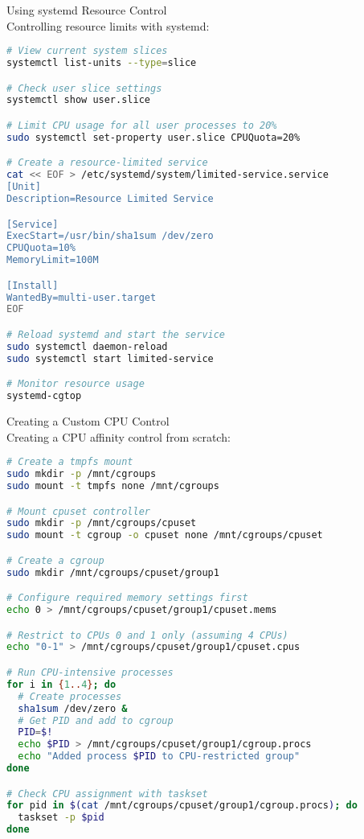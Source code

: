 \begin{example2}{Using systemd Resource Control}\\
    Controlling resource limits with systemd:
    
\begin{lstlisting}[language=bash, style=basesmol]
# View current system slices
systemctl list-units --type=slice

# Check user slice settings
systemctl show user.slice

# Limit CPU usage for all user processes to 20%
sudo systemctl set-property user.slice CPUQuota=20%

# Create a resource-limited service
cat << EOF > /etc/systemd/system/limited-service.service
[Unit]
Description=Resource Limited Service

[Service]
ExecStart=/usr/bin/sha1sum /dev/zero
CPUQuota=10%
MemoryLimit=100M

[Install]
WantedBy=multi-user.target
EOF

# Reload systemd and start the service
sudo systemctl daemon-reload
sudo systemctl start limited-service

# Monitor resource usage
systemd-cgtop
\end{lstlisting}
\end{example2}

\begin{example2}{Creating a Custom CPU Control}\\
    Creating a CPU affinity control from scratch:
    
\begin{lstlisting}[language=bash, style=basesmol]
# Create a tmpfs mount
sudo mkdir -p /mnt/cgroups
sudo mount -t tmpfs none /mnt/cgroups

# Mount cpuset controller
sudo mkdir -p /mnt/cgroups/cpuset
sudo mount -t cgroup -o cpuset none /mnt/cgroups/cpuset

# Create a cgroup
sudo mkdir /mnt/cgroups/cpuset/group1

# Configure required memory settings first
echo 0 > /mnt/cgroups/cpuset/group1/cpuset.mems

# Restrict to CPUs 0 and 1 only (assuming 4 CPUs)
echo "0-1" > /mnt/cgroups/cpuset/group1/cpuset.cpus

# Run CPU-intensive processes
for i in {1..4}; do
  # Create processes
  sha1sum /dev/zero &
  # Get PID and add to cgroup
  PID=$!
  echo $PID > /mnt/cgroups/cpuset/group1/cgroup.procs
  echo "Added process $PID to CPU-restricted group"
done

# Check CPU assignment with taskset
for pid in $(cat /mnt/cgroups/cpuset/group1/cgroup.procs); do
  taskset -p $pid
done
\end{lstlisting}
\end{example2}